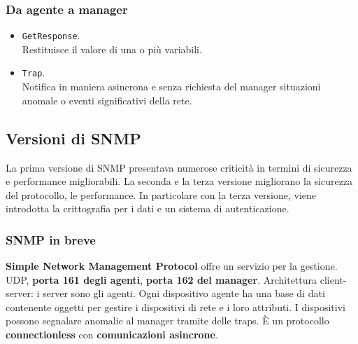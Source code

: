 \subsubsection{Da agente a manager}
\begin{itemize}
    \item \verb|GetResponse|.\\
    Restituisce il valore di una o più variabili.
    \item \verb|Trap|.\\
    Notifica in maniera asincrona e senza richiesta del manager situazioni anomale o eventi significativi della rete.
\end{itemize}

\subsection{Versioni di SNMP}
La prima versione di SNMP presentava numerose criticità in termini di sicurezza e performance migliorabili. La seconda e la terza versione migliorano la sicurezza del protocollo, le performance. In particolare con la terza versione, viene introdotta la crittografia per i dati e un sistema di autenticazione.

\subsubsection{SNMP in breve}
\textbf{Simple Network Management Protocol} offre un servizio per la gestione. UDP, \textbf{porta 161 degli agenti}, \textbf{porta 162 del manager}. Architettura client-server: i server sono gli agenti. Ogni dispositivo agente ha una base di dati contenente oggetti per gestire i dispositivi di rete e i loro attributi. I dispositivi possono segnalare anomalie al manager tramite delle traps. È un protocollo \textbf{connectionless} con \textbf{comunicazioni asincrone}.

